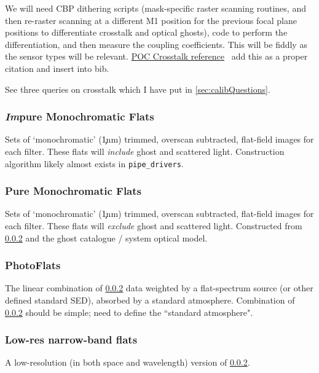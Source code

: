 We will need CBP dithering scripts (mask-specific raster scanning routines, and then re-raster scanning at a different M1 position for the previous focal plane positions to differentiate crosstalk and optical ghosts), code to perform the differentiation, and then measure the coupling coefficients. This will be fiddly as the sensor types will be relevant. \hyperref{http://iopscience.iop.org/article/10.1088/1748-0221/10/05/C05010}{}{}{POC Crosstalk reference} \xxx\ add this as a proper citation and insert into bib.
\begin{note}
	See three queries on crosstalk which I have put in \secsymbol\ref{sec:calibQuestions}.
\end{note}



\subsubsection{\emph{Im}pure Monochromatic Flats}\label{calibProducts:monoFlat}
Sets of `monochromatic' (\c 1nm) trimmed, overscan subtracted, flat-field images for each filter.  These flats will \textit{include} ghost and scattered light.
\alg Construction algorithm likely almost exists in \texttt{pipe\_drivers}.


\subsubsection{Pure Monochromatic Flats}\label{calibProducts:monoPhotoFlat}
Sets of `monochromatic' (\c 1nm) trimmed, overscan subtracted, flat-field images for each filter.  These flats will \textit{exclude} ghost and scattered light.
\alg Constructed from \ref{calibProducts:monoPhotoFlat} and the ghost catalogue / system optical model.


\subsubsection{PhotoFlats}\label{calibProducts:standardPhotoFlat}
The linear combination of \ref{calibProducts:monoPhotoFlat} data weighted by a flat-spectrum source (or other defined standard SED), absorbed by a standard atmosphere.
\alg Combination of \ref{calibProducts:monoPhotoFlat} should be simple; need to define the ``standard atmosphere".


\subsubsection{Low-res narrow-band flats}\label{calibProducts:monoPhotoFlatLowRes}
A low-resolution (in both space and wavelength) version of  \ref{calibProducts:monoPhotoFlat}.
\alg {}


